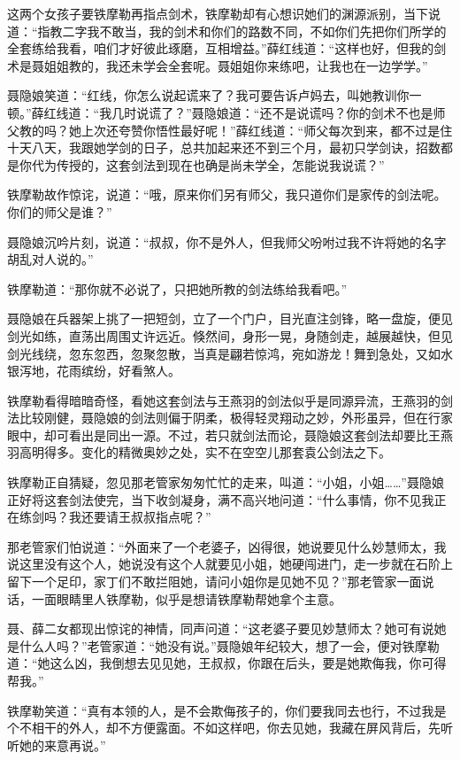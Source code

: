\documentclass[12pt,oneside]{book}
\begin{document}
这两个女孩子要铁摩勒再指点剑术，铁摩勒却有心想识她们的渊源派别，当下说道：``指教二字我不敢当，我的剑术和你们的路数不同，不如你们先把你们所学的全套练给我看，咱们才好彼此琢磨，互相增益。''薛红线道：``这样也好，但我的剑术是聂姐姐教的，我还未学会全套呢。聂姐姐你来练吧，让我也在一边学学。''

聂隐娘笑道：``红线，你怎么说起谎来了？我可要告诉卢妈去，叫她教训你一顿。''薛红线道：``我几时说谎了？''聂隐娘道：``还不是说谎吗？你的剑术不也是师父教的吗？她上次还夸赞你悟性最好呢！''薛红线道：``师父每次到来，都不过是住十天八天，我跟她学剑的日子，总共加起来还不到三个月，最初只学剑诀，招数都是你代为传授的，这套剑法到现在也确是尚未学全，怎能说我说谎？''

铁摩勒故作惊诧，说道：``哦，原来你们另有师父，我只道你们是家传的剑法呢。你们的师父是谁？''

聂隐娘沉吟片刻，说道：``叔叔，你不是外人，但我师父吩咐过我不许将她的名字胡乱对人说的。''

铁摩勒道：``那你就不必说了，只把她所教的剑法练给我看吧。''

聂隐娘在兵器架上挑了一把短剑，立了一个门户，目光直注剑锋，略一盘旋，便见剑光如练，直荡出周围丈许远近。倏然间，身形一晃，身随剑走，越展越快，但见剑光线绕，忽东忽西，忽聚忽散，当真是翩若惊鸿，宛如游龙！舞到急处，又如水银泻地，花雨缤纷，好看煞人。

铁摩勒看得暗暗奇怪，看她这套剑法与王燕羽的剑法似乎是同源异流，王燕羽的剑法比较刚健，聂隐娘的剑法则偏于阴柔，极得轻灵翔动之妙，外形虽异，但在行家眼中，却可看出是同出一源。不过，若只就剑法而论，聂隐娘这套剑法却要比王燕羽高明得多。变化的精微奥妙之处，实不在空空儿那套袁公剑法之下。

铁摩勒正自猜疑，忽见那老管家匆匆忙忙的走来，叫道：``小姐，小姐\ldots\ldots{}''聂隐娘正好将这套剑法使完，当下收剑凝身，满不高兴地问道：``什么事情，你不见我正在练剑吗？我还要请王叔叔指点呢？''

那老管家们怕说道：``外面来了一个老婆子，凶得很，她说要见什么妙慧师太，我说这里没有这个人，她说没有这个人就要见小姐，她硬闯进门，走一步就在石阶上留下一个足印，家丁们不敢拦阻她，请问小姐你是见她不见？''那老管家一面说话，一面眼睛里人铁摩勒，似乎是想请铁摩勒帮她拿个主意。

聂、薛二女都现出惊诧的神情，同声问道：``这老婆子要见妙慧师太？她可有说她是什么人吗？''老管家道：``她没有说。''聂隐娘年纪较大，想了一会，便对铁摩勒道：``她这么凶，我倒想去见见她，王叔叔，你跟在后头，要是她欺侮我，你可得帮我。''

铁摩勒笑道：``真有本领的人，是不会欺侮孩子的，你们要我同去也行，不过我是个不相干的外人，却不方便露面。不如这样吧，你去见她，我藏在屏风背后，先听听她的来意再说。''
\end{document}
